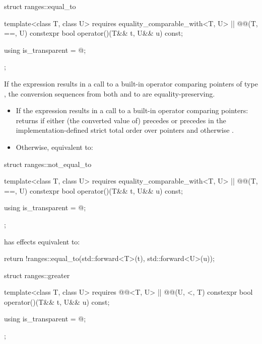 %
\begin{itemdecl}
struct ranges::equal_to {
  template<class T, class U>
    requires equality_comparable_with<T, U> || @@(T, ==, U)
  constexpr bool operator()(T&& t, U&& u) const;

  using is_transparent = @\unspecnc@;
};
\end{itemdecl}

\begin{itemdescr}
\pnum
\expects
If the expression 
results in a call to a built-in operator \tcode{==} comparing pointers of type
, the conversion sequences from both  and  to 
are equality-preserving.

\pnum
\effects
\begin{itemize}
\item
  If the expression  results in
  a call to a built-in operator \tcode{==} comparing pointers:
  returns  if either (the converted value of)  precedes
   or  precedes  in the implementation-defined strict
  total order over pointers and otherwise .

\item
  Otherwise, equivalent to:
\end{itemize}
\end{itemdescr}

%
\begin{itemdecl}
struct ranges::not_equal_to {
  template<class T, class U>
    requires equality_comparable_with<T, U> || @@(T, ==, U)
  constexpr bool operator()(T&& t, U&& u) const;

  using is_transparent = @\unspecnc@;
};
\end{itemdecl}

\begin{itemdescr}
\pnum
{} has effects equivalent to:
\begin{codeblock}
return !ranges::equal_to{}(std::forward<T>(t), std::forward<U>(u));
\end{codeblock}
\end{itemdescr}

%
\begin{itemdecl}
struct ranges::greater {
  template<class T, class U>
    requires @@<T, U> || @@(U, <, T)
  constexpr bool operator()(T&& t, U&& u) const;

  using is_transparent = @\unspecnc@;
};
\end{itemdecl}

